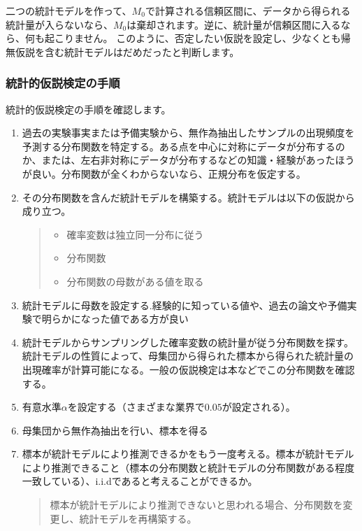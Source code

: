二つの統計モデルを作って、$M_0$で計算される信頼区間に、データから得られる統計量が入らないなら、$M_0$は棄却されます。逆に、統計量が信頼区間に入るなら、何も起こりません。
このように、否定したい仮説を設定し、少なくとも帰無仮説を含む統計モデルはだめだったと判断します。

\subsubsection{統計的仮説検定の手順}
統計的仮説検定の手順を確認します。
\begin{framed}
    \begin{enumerate}
        \item 過去の実験事実または予備実験から、無作為抽出したサンプルの出現頻度を予測する分布関数を特定する。ある点を中心に対称にデータが分布するのか、または、左右非対称にデータが分布するなどの知識・経験があったほうが良い。分布関数が全くわからないなら、正規分布を仮定する。
        \item その分布関数を含んだ統計モデルを構築する。統計モデルは以下の仮説から成り立つ。
        \begin{quote}
            \begin{itemize}
                \item 確率変数は独立同一分布に従う
                \item 分布関数
                \item 分布関数の母数がある値を取る
            \end{itemize}
        \end{quote}
        \item 統計モデルに母数を設定する.経験的に知っている値や、過去の論文や予備実験で明らかになった値である方が良い
        \item 統計モデルからサンプリングした確率変数の統計量が従う分布関数を探す。統計モデルの性質によって、母集団から得られた標本から得られた統計量の出現確率が計算可能になる。一般の仮説検定は本などでこの分布関数を確認する。
        \item 有意水準$\alpha$を設定する（さまざまな業界で$0.05$が設定される）。
        \item 母集団から無作為抽出を行い、標本を得る
        \item 標本が統計モデルにより推測できるかをもう一度考える。標本が統計モデルにより推測できること（標本の分布関数と統計モデルの分布関数がある程度一致している）、i.i.dであると考えることができるか。
        \begin{quote}
            標本が統計モデルにより推測できないと思われる場合、分布関数を変更し、統計モデルを再構築する。


\end{quote}
\end{enumerate}
\end{framed}
